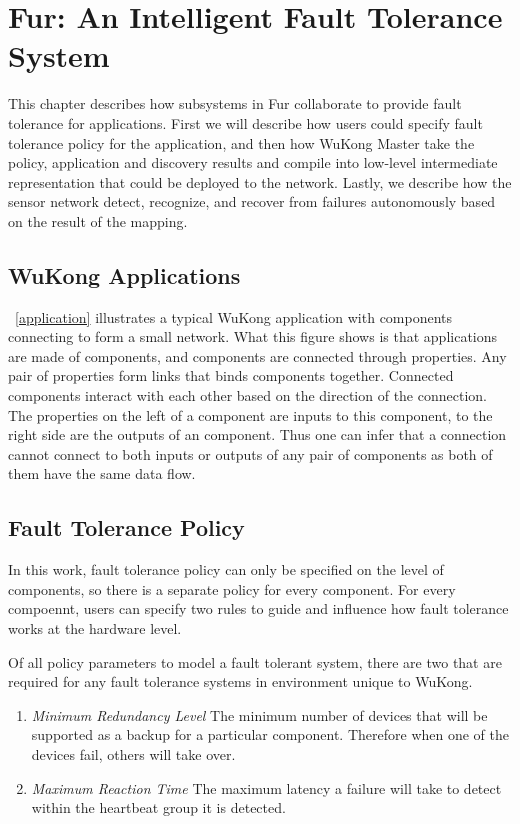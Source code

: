 \chapter{Fur: An Intelligent Fault Tolerance System}
\label{c:fur}

This chapter describes how subsystems in Fur collaborate to provide fault tolerance
for applications. First we will describe how users could specify fault
tolerance policy for the application, and then how WuKong Master take
the policy, application and discovery results and compile into low-level
intermediate representation that could be deployed to the network. Lastly, we 
describe how the sensor network detect, recognize, and recover from failures
autonomously based on the result of the mapping.

\section{WuKong Applications}

~\ref{application} illustrates a typical WuKong application with components
connecting to form a small network. What this figure shows is that applications
are made of components, and components are connected through properties.
Any pair of properties form links that binds components together. Connected
components interact with each other based on the direction of the connection.
The properties on the left of a component are inputs to this component, to the
right side are the outputs of an component. Thus one can infer that
a connection cannot connect to both inputs or outputs of any pair of components
as both of them have the same data flow.

\section{Fault Tolerance Policy}

In this work, fault tolerance policy can only be specified on the level of
components, so there is a separate policy for every component. For every
compoennt, users can specify two rules to guide and influence how fault
tolerance works at the hardware level.

Of all policy parameters to model a fault tolerant system, there are two that
are required for any fault tolerance systems in environment unique to WuKong.

\begin{enumerate}
\item \emph{Minimum Redundancy Level} The minimum number of devices that will be
supported as a backup for a particular component. Therefore when one of the
devices fail, others will take over.

\item \emph{Maximum Reaction Time} The maximum latency a failure will take to detect
within the heartbeat group it is detected.
\end{enumerate}

